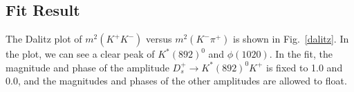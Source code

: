 \subsection{Fit Result}
\par{
    The Dalitz plot of $m^{2}(K^{+}K^{-})$ versus $m^{2}(K^{-}\pi^{+})$ is shown in Fig.~\ref{dalitz}. 
    In the plot, we can see a clear peak of $K^{*}(892)^{0}$ and $\phi(1020)$. 
In the fit, the magnitude and phase of the amplitude $D_{s}^{+} \rightarrow K^{*}(892)^{0}K^{+}$ is fixed to 1.0 and 0.0, and the magnitudes and phases of the other amplitudes are allowed to float. 


}
